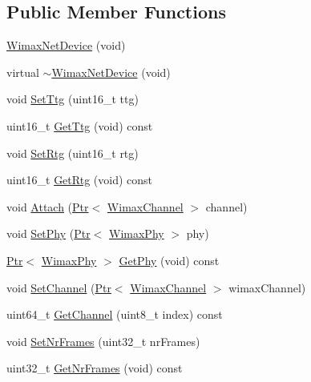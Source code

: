 \subsection*{Public Member Functions}
\begin{DoxyCompactItemize}
\item 
\hyperlink{classns3_1_1WimaxNetDevice_ad70bee64c458c43a6f374629dbf85f66}{Wimax\+Net\+Device} (void)
\item 
virtual \hyperlink{classns3_1_1WimaxNetDevice_a9c4dc5b24e74c75047bfe825c0518647}{$\sim$\+Wimax\+Net\+Device} (void)
\item 
void \hyperlink{classns3_1_1WimaxNetDevice_aa6b912e871343b31c16d8897abc77565}{Set\+Ttg} (uint16\+\_\+t ttg)
\item 
uint16\+\_\+t \hyperlink{classns3_1_1WimaxNetDevice_a229b824a5959b3231ac6edf6d3c01ab6}{Get\+Ttg} (void) const 
\item 
void \hyperlink{classns3_1_1WimaxNetDevice_a0fd2e927d4e58b5854bf0d78d7615eb4}{Set\+Rtg} (uint16\+\_\+t rtg)
\item 
uint16\+\_\+t \hyperlink{classns3_1_1WimaxNetDevice_abd27010a030924757238ad2baef094f0}{Get\+Rtg} (void) const 
\item 
void \hyperlink{classns3_1_1WimaxNetDevice_aa289072fc2a02899f0b4985b9d7d1303}{Attach} (\hyperlink{classns3_1_1Ptr}{Ptr}$<$ \hyperlink{classns3_1_1WimaxChannel}{Wimax\+Channel} $>$ channel)
\item 
void \hyperlink{classns3_1_1WimaxNetDevice_a367b1a9115fa3ba1d354cc4b6d34c283}{Set\+Phy} (\hyperlink{classns3_1_1Ptr}{Ptr}$<$ \hyperlink{classns3_1_1WimaxPhy}{Wimax\+Phy} $>$ phy)
\item 
\hyperlink{classns3_1_1Ptr}{Ptr}$<$ \hyperlink{classns3_1_1WimaxPhy}{Wimax\+Phy} $>$ \hyperlink{classns3_1_1WimaxNetDevice_a81c1f9d43acfc9cd5d642b784102a21f}{Get\+Phy} (void) const 
\item 
void \hyperlink{classns3_1_1WimaxNetDevice_a748df41d5e3c7bdacd8bd8f72754aa22}{Set\+Channel} (\hyperlink{classns3_1_1Ptr}{Ptr}$<$ \hyperlink{classns3_1_1WimaxChannel}{Wimax\+Channel} $>$ wimax\+Channel)
\item 
uint64\+\_\+t \hyperlink{classns3_1_1WimaxNetDevice_a758598a33e809b2186f07e2fcd7f9a11}{Get\+Channel} (uint8\+\_\+t index) const 
\item 
void \hyperlink{classns3_1_1WimaxNetDevice_aae61255eadbac0ed370b3d6f679ab1fc}{Set\+Nr\+Frames} (uint32\+\_\+t nr\+Frames)
\item 
uint32\+\_\+t \hyperlink{classns3_1_1WimaxNetDevice_ad31c0246d640e1d99b1baf3bc5144d36}{Get\+Nr\+Frames} (void) const 

\end{DoxyCompactItemize}
